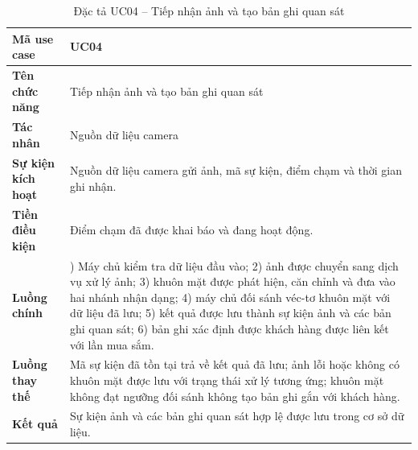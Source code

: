 \documentclass[../LuanVan.tex]{subfiles}
\begin{document}
\begin{table}[H]
    \centering
    \caption{Đặc tả UC04 -- Tiếp nhận ảnh và tạo bản ghi quan sát}
    \label{tab:uc04_observation_ch4}
    \begin{tabular}{|>{\raggedright\arraybackslash}p{3.0cm}|>{\raggedright\arraybackslash}p{10.9cm}|}
        \hline
        \textbf{Mã use case} & UC04 \\
        \hline
        \textbf{Tên chức năng} & Tiếp nhận ảnh và tạo bản ghi quan sát \\
        \hline
        \textbf{Tác nhân} & Nguồn dữ liệu camera \\
        \hline
        \textbf{Sự kiện kích hoạt} & Nguồn dữ liệu camera gửi ảnh, mã sự kiện, điểm chạm và thời gian ghi nhận. \\
        \hline
        \textbf{Tiền điều kiện} & Điểm chạm đã được khai báo và đang hoạt động. \\
        \hline
        \textbf{Luồng chính} & 1) Máy chủ kiểm tra dữ liệu đầu vào; 2) ảnh được chuyển sang dịch vụ xử lý ảnh; 3) khuôn mặt được phát hiện, căn chỉnh và đưa vào hai nhánh nhận dạng; 4) máy chủ đối sánh véc-tơ khuôn mặt với dữ liệu đã lưu; 5) kết quả được lưu thành sự kiện ảnh và các bản ghi quan sát; 6) bản ghi xác định được khách hàng được liên kết với lần mua sắm. \\
        \hline
        \textbf{Luồng thay thế} & Mã sự kiện đã tồn tại trả về kết quả đã lưu; ảnh lỗi hoặc không có khuôn mặt được lưu với trạng thái xử lý tương ứng; khuôn mặt không đạt ngưỡng đối sánh không tạo bản ghi gắn với khách hàng. \\
        \hline
        \textbf{Kết quả} & Sự kiện ảnh và các bản ghi quan sát hợp lệ được lưu trong cơ sở dữ liệu. \\
        \hline
    \end{tabular}
\end{table}
\end{document}
